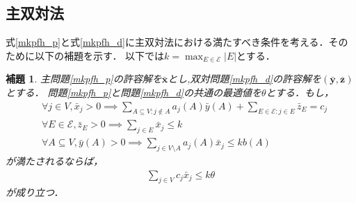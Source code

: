 \documentclass[11pt,dvipdfmx]{jarticle}
\numberwithin{equation}{section}
\newtheorem{lem}{補題}[section]
\begin{document}
    \subsection{主双対法}
        式\eqref{mkpfh_p}と式\eqref{mkpfh_d}に主双対法における満たすべき条件を考える．そのために以下の補題を示す．
        以下では$k=\displaystyle\max_{E\in \mathcal{E}}|E|$とする．
        \begin{lem}
            主問題\eqref{mkpfh_p}の許容解を$\bar{\bm{x}}$とし,双対問題\eqref{mkpfh_d}の許容解を$(\bar{\bm{y}},\bar{\bm{z}})$とする．
            問題\eqref{mkpfh_p}と問題\eqref{mkpfh_d}の共通の最適値を$\theta$とする．もし，
            \begin{subequations}
                \begin{align}
                    &\forall j\in V,\bar{x}_j>0  \implies \displaystyle\sum_{A\subseteq V:j\notin A}{a_j(A)\bar{y}(A)}+\sum_{E\in \mathcal{E}: j\in E}{\bar{z}_E}=c_j \label{mkpfh_pd_1}\\
                    &\forall E\in\mathcal{E},\bar{z}_E>0  \implies \displaystyle\sum_{j\in E}{\bar{x}_j}\le k \label{mkpfh_pd_2}\\
                    &\forall A\subseteq V,\bar{y}(A)>0 \implies \displaystyle\sum_{j\in V\setminus A}{a_j(A)\bar{x}_j}\le kb(A) \label{mkpfh_pd_3}
                \end{align}\label{mkpfh_pd}
            \end{subequations}
            が満たされるならば，
            \begin{align}
                \sum_{j\in V}{c_j\bar{x}_j}\le k\theta
                \label{mkpfh_ans}
            \end{align}
            が成り立つ．
            \label{lem3}
        \end{lem}
\end{document}
